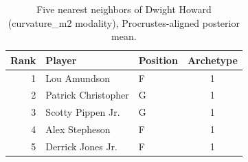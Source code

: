 \begin{table}[htbp]
  \centering\small
  \begin{tabular}{rllc}
    \toprule
    Rank & Player & Position & Archetype \\
    \midrule
    1 & Lou Amundson & F & 1 \\
    2 & Patrick Christopher & G & 1 \\
    3 & Scotty Pippen Jr. & G & 1 \\
    4 & Alex Stepheson & F & 1 \\
    5 & Derrick Jones Jr. & F & 1 \\
    \bottomrule
  \end{tabular}
  \caption{Five nearest neighbors of Dwight Howard (curvature_m2 modality), Procrustes-aligned posterior mean.}
  \label{tab:Dwight_Howard_neighbors_curvature_m2}
\end{table}

